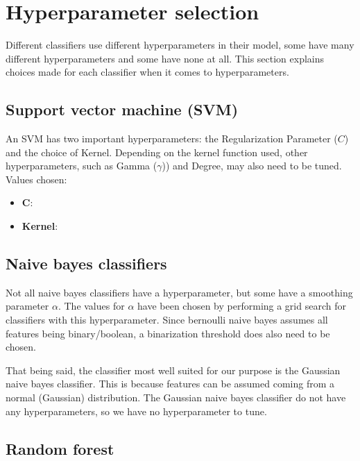 \section{Hyperparameter selection}

Different classifiers use different hyperparameters in their model, some have many different hyperparameters and some have none at all. This section explains choices made for each classifier when it comes to hyperparameters.

\subsection{Support vector machine (SVM)}
An SVM has two important hyperparameters: the Regularization Parameter (\(C\)) and the choice of Kernel. 
Depending on the kernel function used, other hyperparameters, such as Gamma (\(\gamma\))) and Degree, may also need to be tuned.
 Values chosen:
\begin{itemize}
    \item \textbf{\(\boldsymbol{C}\)}:
    \item \textbf{Kernel}:
\end{itemize}

\subsection{Naive bayes classifiers}
Not all naive bayes classifiers have a hyperparameter, but some have a smoothing parameter $\alpha$. The values for $\alpha$ have been chosen by performing a grid search for classifiers with this hyperparameter. Since bernoulli naive bayes assumes all features being binary/boolean, a binarization threshold does also need to be chosen. 
\par
That being said, the classifier most well suited for our purpose is the Gaussian naive bayes classifier. This is because features can be assumed coming from a normal (Gaussian) distribution. The Gaussian naive bayes classifier do not have any hyperparameters, so we have no hyperparameter to tune. 

\subsection{Random forest}
